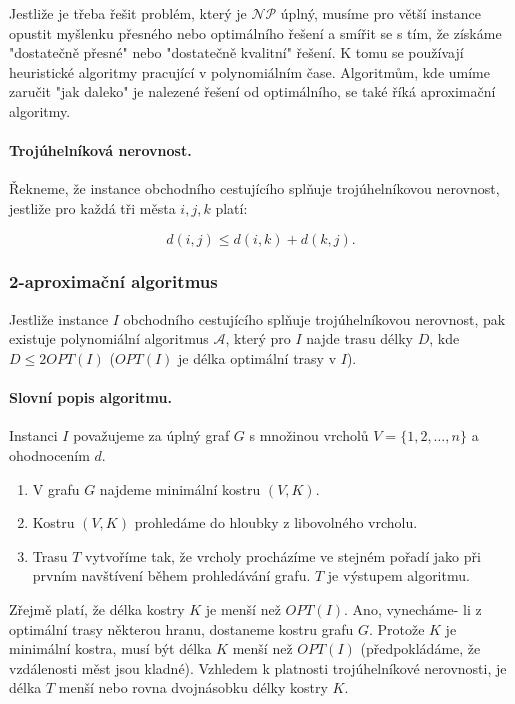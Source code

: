 Jestliže je třeba řešit problém, který je $\mathcal{NP}$ úplný, musíme pro větší instance opustit myšlenku přesného nebo optimálního řešení a smířit se s tím, že získáme "dostatečně přesné" nebo "dostatečně kvalitní" řešení. K tomu se používají heuristické algoritmy pracující v polynomiálním čase. Algoritmům, kde umíme zaručit "jak daleko" je nalezené řešení od optimálního, se také říká aproximační algoritmy.

\paragraph{Trojúhelníková nerovnost.} Řekneme, že instance obchodního cestujícího splňuje trojúhelníkovou nerovnost, jestliže pro každá tři města $i,j,k$ platí:

$$d(i, j) \leq d(i, k) + d(k, j).$$

\subsubsection*{2-aproximační algoritmus}
Jestliže instance $I$ obchodního cestujícího splňuje trojúhelníkovou nerovnost, pak existuje polynomiální algoritmus $\mathcal{A}$, který pro $I$ najde trasu délky $D$, kde $D \leq 2OPT(I)$ ($OPT(I)$ je délka optimální trasy v $I$).

\paragraph{Slovní popis algoritmu.} Instanci $I$ považujeme za úplný graf $G$ s množinou vrcholů $V = \{1, 2, \hdots , n\}$ a ohodnocením $d$.
\begin{enumerate}[itemsep=0pt]
    \item V grafu $G$ najdeme minimální kostru $(V,K)$.
    \item Kostru $(V,K)$ prohledáme do hloubky z libovolného vrcholu.
    \item Trasu $T$ vytvoříme tak, že vrcholy procházíme ve stejném pořadí jako při prvním navštívení během prohledávání grafu. $T$ je výstupem algoritmu.
\end{enumerate}
Zřejmě platí, že délka kostry $K$ je menší než $OPT(I)$. Ano, vynecháme- li z optimální trasy některou hranu, dostaneme kostru grafu $G$. Protože $K$ je minimální kostra, musí být délka $K$ menší než $OPT(I)$ (předpokládáme, že vzdálenosti měst jsou kladné). Vzhledem k platnosti trojúhelníkové nerovnosti, je délka $T$ menší nebo rovna dvojnásobku délky kostry $K$.

